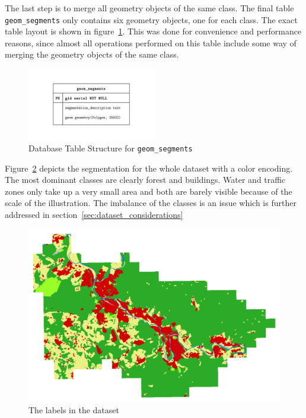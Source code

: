 The last step is to merge all geometry objects of the same class. The final table \texttt{geom\_segments} only contains six geometry objects, one for each class. The exact table layout is shown in figure~\ref{fig:geom_segments_entities}. This was done for convenience and performance reasons, since almost all operations performed on this table include some way of merging the geometry objects of the same class.

\begin{figure}[h]
    \centering
    \includegraphics[width=0.5\textwidth]{images/geom_segments_entities}
    \caption{Database Table Structure for \texttt{geom\_segments}}
    \label{fig:geom_segments_entities}
\end{figure}

Figure~\ref{fig:dop_label_all} depicts the segmentation for the whole dataset with a color encoding. The most dominant classes are clearly forest and buildings. Water and traffic zones only take up a very small area and both are barely visible because of the scale of the illustration. The imbalance of the classes is an issue which is further addressed in section~\ref{sec:dataset_considerations}

\begin{figure}[h]
    \centering
    \includegraphics[width=\textwidth]{images/dop_label_all}
    \caption{The labels in the dataset}
    \label{fig:dop_label_all}
\end{figure}

